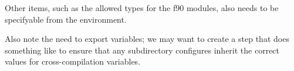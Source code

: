 \documentclass{article}
\begin{document}
Other items, such as the allowed types for the f90 modules, also needs
to be specifyable from the environment.

Also note the need to export variables; we may want to
create a step that does something like  to ensure that any subdirectory configures inherit the
correct values for cross-compilation variables.


\end{document}
